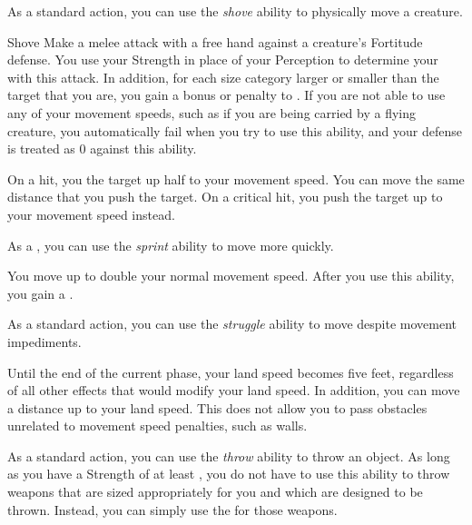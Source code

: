          As a standard action, you can use the \textit{shove} ability to physically move a creature.

        \begin{freeability}{Shove}\label{Shove}
            Make a melee attack with a free hand against a creature's Fortitude defense.
            You use your Strength in place of your Perception to determine your  with this attack.
            In addition, for each size category larger or smaller than the target that you are, you gain a  bonus or penalty to .
            If you are not able to use any of your movement speeds, such as if you are being carried by a flying creature, you automatically fail when you try to use this ability, and your defense is treated as 0 against this ability.

            On a hit, you  the target up half to your movement speed.
            You can move the same distance that you push the target.
            On a critical hit, you push the target up to your movement speed instead.
        \end{freeability}

         As a , you can use the \textit{sprint} ability to move more quickly.

        \begin{freeability}{}
            You move up to double your normal movement speed.
            After you use this ability, you gain a .
        \end{freeability}

         As a standard action, you can use the \textit{struggle} ability to move despite movement impediments.

        \begin{freeability}{}
            Until the end of the current phase, your land speed becomes five feet, regardless of all other effects that would modify your land speed.
            In addition, you can move a distance up to your land speed.
            This does not allow you to pass obstacles unrelated to movement speed penalties, such as walls.
        \end{freeability}

         As a standard action, you can use the \textit{throw} ability to throw an object.
        As long as you have a Strength of at least , you do not have to use this ability to throw weapons that are sized appropriately for you and which are designed to be thrown.
        Instead, you can simply use the  for those weapons.

